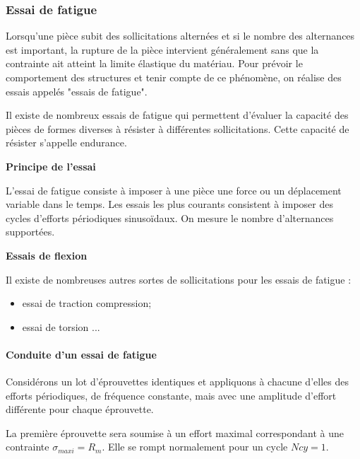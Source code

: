 \documentclass[11pt,oneside]{article}
\begin{document}
\subsubsection{Essai de fatigue \cite{jb}}

Lorsqu'une pièce subit des sollicitations alternées et si le nombre des alternances est important, la rupture de la pièce intervient généralement sans que la contrainte ait atteint la limite élastique du matériau. Pour prévoir le comportement des structures et tenir compte de ce phénomène, on réalise des essais appelés "essais de fatigue". 

Il existe de nombreux essais de fatigue qui permettent d'évaluer la capacité des pièces de formes diverses à résister à différentes sollicitations. Cette capacité de résister s'appelle endurance.

\begin{obj}
\textbf{Principe de l'essai}

L'essai de fatigue consiste à imposer à une pièce une force ou un déplacement variable dans le temps. Les essais les plus courants consistent à imposer des cycles d'efforts périodiques sinusoïdaux. On mesure le nombre d'alternances supportées. 

\end{obj}


\begin{exemple}
\textbf{Essais de flexion}

\end{exemple}

Il existe de nombreuses autres sortes de sollicitations pour les essais de fatigue :
\begin{itemize}
\item essai de traction compression;
\item essai de torsion ...
\end{itemize}


\paragraph*{Conduite d'un essai de fatigue}

Considérons un lot d'éprouvettes identiques et appliquons à chacune d'elles des efforts périodiques, de fréquence constante, mais avec une amplitude d'effort différente pour chaque éprouvette. 

La première éprouvette sera soumise à un effort maximal correspondant à une contrainte $\sigma_{maxi} = R_m$. Elle se rompt normalement pour un cycle $Ncy = 1$. 
\end{document}
